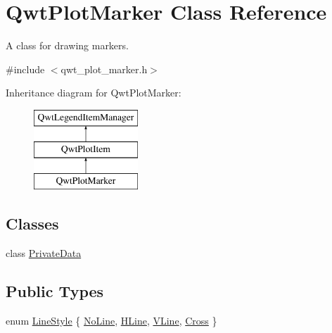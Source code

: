 \hypertarget{class_qwt_plot_marker}{\section{Qwt\-Plot\-Marker Class Reference}
\label{class_qwt_plot_marker}
}


A class for drawing markers.  




{\ttfamily \#include $<$qwt\-\_\-plot\-\_\-marker.\-h$>$}

Inheritance diagram for Qwt\-Plot\-Marker\-:\begin{figure}[H]
\begin{center}
\leavevmode
\includegraphics[height=3.000000cm]{class_qwt_plot_marker}
\end{center}
\end{figure}
\subsection*{Classes}
\begin{DoxyCompactItemize}
\item 
class \hyperlink{class_qwt_plot_marker_1_1_private_data}{Private\-Data}
\end{DoxyCompactItemize}
\subsection*{Public Types}
\begin{DoxyCompactItemize}
\item 
enum \hyperlink{class_qwt_plot_marker_a297efa835423bfa5a870bbc8ff1c623b}{Line\-Style} \{ \hyperlink{class_qwt_plot_marker_a297efa835423bfa5a870bbc8ff1c623ba5407403ea223539c7cac264a9fff5fe0}{No\-Line}, 
\hyperlink{class_qwt_plot_marker_a297efa835423bfa5a870bbc8ff1c623ba4439b2f358352a4cf6414b0ea4861609}{H\-Line}, 
\hyperlink{class_qwt_plot_marker_a297efa835423bfa5a870bbc8ff1c623ba55ab75371699cd7c0e55c494da6454dc}{V\-Line}, 
\hyperlink{class_qwt_plot_marker_a297efa835423bfa5a870bbc8ff1c623ba5014eec17204ed4b0cec35e7322696d2}{Cross}
 \}
\end{DoxyCompactItemize}
